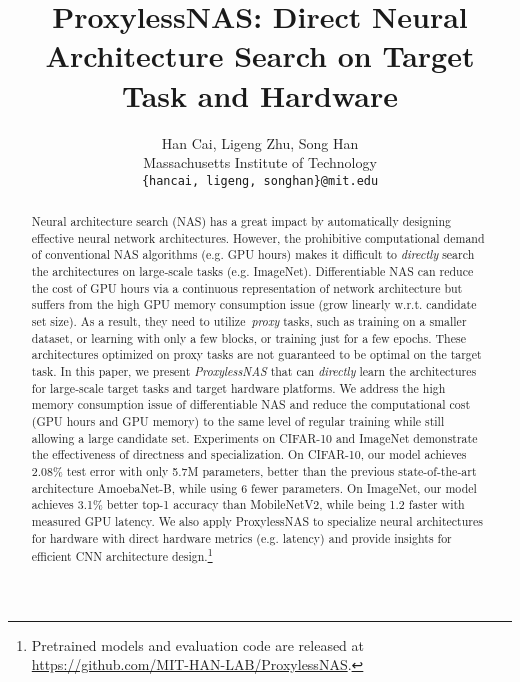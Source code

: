 \documentclass{article} \usepackage{iclr2019_conference,times}
\title{ProxylessNAS: Direct Neural Architecture Search on Target Task and Hardware}
\author{Han Cai, Ligeng Zhu, Song Han \\
Massachusetts Institute of Technology \\
\texttt{\{hancai, ligeng, songhan\}@mit.edu} \\
}
\begin{document}
\maketitle

\begin{abstract}
Neural architecture search (NAS) has a great impact by automatically designing effective neural network architectures. However, the prohibitive computational demand of conventional NAS algorithms (e.g.  GPU hours) makes it difficult to \emph{directly} search the architectures on large-scale tasks (e.g. ImageNet). Differentiable NAS can reduce the cost of GPU hours via a continuous representation of network architecture but suffers from the high GPU memory consumption issue (grow linearly w.r.t. candidate set size). As a result, they need to utilize~\emph{proxy} tasks, such as training on a smaller dataset, or learning with only a few blocks, or training just for a few epochs. These architectures optimized on proxy tasks are not guaranteed to be optimal on the target task. 
In this paper, we present \emph{ProxylessNAS} that can \emph{directly} learn the architectures for large-scale target tasks and target hardware platforms.  
We address the high memory consumption issue of differentiable NAS and reduce the computational cost (GPU hours and GPU memory) to the same level of regular training while still allowing a large candidate set. 
Experiments on CIFAR-10 and ImageNet demonstrate the effectiveness of directness and specialization. On CIFAR-10, our model achieves 2.08\% test error with only 5.7M parameters, better than the previous state-of-the-art architecture AmoebaNet-B, while using 6 fewer parameters. On ImageNet, our model achieves 3.1\% better top-1 accuracy than MobileNetV2, while being 1.2 faster with measured GPU latency. 
We also apply ProxylessNAS to specialize neural architectures for hardware with direct hardware metrics (e.g. latency) and provide insights for efficient CNN architecture design.\footnote{Pretrained models and evaluation code are released at \href{https://github.com/MIT-HAN-LAB/ProxylessNAS}{https://github.com/MIT-HAN-LAB/ProxylessNAS}.}
\end{abstract}
\end{document}
